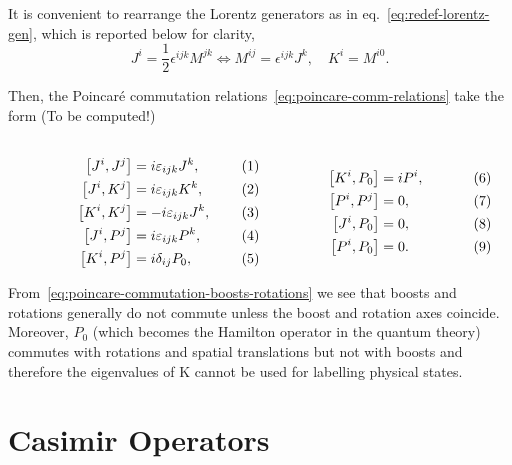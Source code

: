 It is convenient to rearrange the Lorentz generators as in eq.~\eqref{eq:redef-lorentz-gen}, which is reported below for clarity,
\begin{equation}
    J^i = \frac{1}{2} \epsilon^{ijk} M^{jk} \iff M^{ij} = \epsilon^{ijk} J^k, \quad K^i = M^{i0} .
\end{equation}

Then, the Poincaré commutation relations~\eqref{eq:poincare-comm-relations} take the form (\color{red}To be computed!\color{black})

\begin{subequations}
\label{eq:poincare-commutation-boosts-rotations}
\noindent\centering
    \begin{minipage}{0.48\textwidth}
        \begin{align}
        \comm{J^i}{J^j} &= i \epsilon_{ijk} J^k, \\
        \comm{J^i}{K^j} &= i \epsilon_{ijk} K^k ,\\
        \comm{K^i}{K^j} &= -i \epsilon_{ijk} J^k, \\
        \comm{J^i}{P^j} &= i \epsilon_{ijk} P^k ,\\
        \comm{K^i}{P^j} &= i \delta_{ij} P_0,
        \end{align}
    \end{minipage}
    \hfill
    \begin{minipage}{0.48\textwidth}
    \label{eq:bell_states}
        \begin{align}
        \comm{K^i}{P_0} &= i P^i ,\\
        \comm{P^i}{P^j} &= 0, \\
        \comm{J^i}{P_0} &= 0, \\
        \comm{P^i}{P_0} &= 0 .
        \end{align}
    \end{minipage}\bigskip
    \end{subequations}

From~\eqref{eq:poincare-commutation-boosts-rotations} we see that boosts and rotations generally do not commute unless the boost and rotation axes coincide. Moreover, $P_0$ (which becomes the Hamilton operator in the quantum theory) commutes with rotations and spatial translations but not with boosts and therefore the eigenvalues of K cannot be used for labelling physical states.


\section{Casimir Operators}

